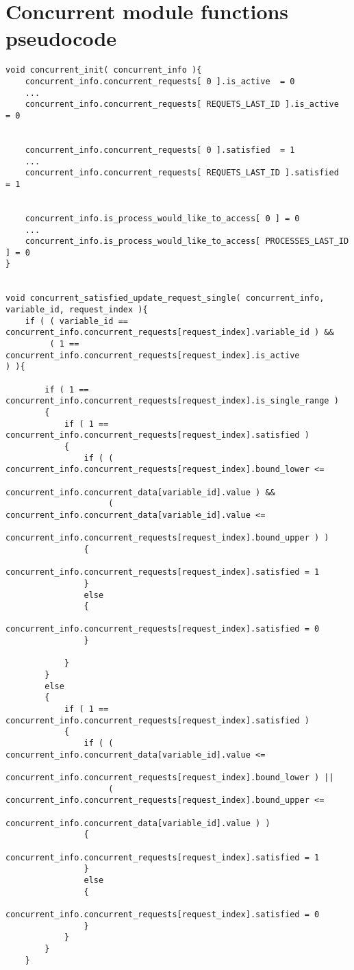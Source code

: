 \chapter{  Concurrent module functions pseudocode }\label{Appendix_1} 
\begin{lstlisting}[style=styleuppaal] 
void concurrent_init( concurrent_info ){
    concurrent_info.concurrent_requests[ 0 ].is_active  = 0
    ...
    concurrent_info.concurrent_requests[ REQUETS_LAST_ID ].is_active  = 0
    
    
    concurrent_info.concurrent_requests[ 0 ].satisfied  = 1
    ...
    concurrent_info.concurrent_requests[ REQUETS_LAST_ID ].satisfied  = 1
    
    
    concurrent_info.is_process_would_like_to_access[ 0 ] = 0
    ...
    concurrent_info.is_process_would_like_to_access[ PROCESSES_LAST_ID ] = 0
}


void concurrent_satisfied_update_request_single( concurrent_info, variable_id, request_index ){
    if ( ( variable_id == concurrent_info.concurrent_requests[request_index].variable_id ) &&
         ( 1 == concurrent_info.concurrent_requests[request_index].is_active             ) ){
        
        if ( 1 == concurrent_info.concurrent_requests[request_index].is_single_range )
        {
            if ( 1 == concurrent_info.concurrent_requests[request_index].satisfied )
            {
                if ( ( concurrent_info.concurrent_requests[request_index].bound_lower <=
                       concurrent_info.concurrent_data[variable_id].value ) &&
                     ( concurrent_info.concurrent_data[variable_id].value <=
                       concurrent_info.concurrent_requests[request_index].bound_upper ) )
                {
                    concurrent_info.concurrent_requests[request_index].satisfied = 1
                }
                else
                {
                    concurrent_info.concurrent_requests[request_index].satisfied = 0
                }
                
            }
        }
        else
        {
            if ( 1 == concurrent_info.concurrent_requests[request_index].satisfied )
            {
                if ( ( concurrent_info.concurrent_data[variable_id].value <=
                       concurrent_info.concurrent_requests[request_index].bound_lower ) ||
                     ( concurrent_info.concurrent_requests[request_index].bound_upper <=
                       concurrent_info.concurrent_data[variable_id].value ) )
                {
                    concurrent_info.concurrent_requests[request_index].satisfied = 1
                }
                else
                {
                    concurrent_info.concurrent_requests[request_index].satisfied = 0
                }
            }
        }
    }
    

\end{lstlisting}

